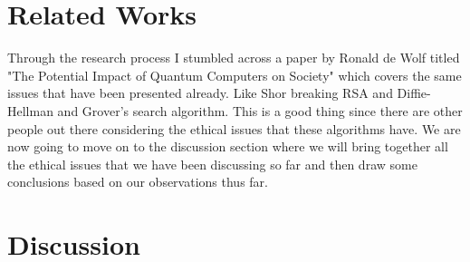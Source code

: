\documentclass{article}
\begin{document}
\section{Related Works}
Through the research process I stumbled across a paper by Ronald de Wolf titled "The Potential Impact of Quantum Computers on Society" which covers the same issues that have been presented already. Like Shor breaking RSA and Diffie-Hellman and  Grover's search algorithm. This is a good thing since there are other people out there considering the ethical issues that these algorithms have. We are now going to move on to the discussion section where we will bring together all the ethical issues that we have been discussing so far and then draw some conclusions based on our observations thus far.  
\section{Discussion}
\end{document}
